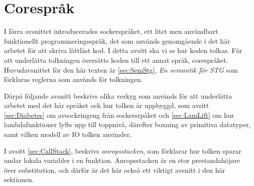 \documentclass[Rapport]{subfiles}
\begin{document}
\section{Corespråk}
\label{sec:Core}


\overviewCore


I förra avsnittet introducerades sockerspråket, ett litet men användbart
funktionellt programmeringsspråk, det som används genomgående i det här
arbetet för att skriva lättläst kod.
    I detta avsitt ska vi se hur koden tolkas. För att underlätta
tolkningen översätts koden till ett annat språk, corespråket. 
Huvudavsnittet för den här texten är \ref{sec:SemStg}, \emph{En semantik för STG}
som förklaras reglerna som används för
tolkningen. 

Därpå följande avsnitt beskrivs olika verkyg som används för att
underlätta arbetet med det här språket och hur tolken är uppbyggd,
som avsitt \ref{sec:Diabetes} om avsockringeng från sockersrpåket och \ref{sec:LamLift} 
om hur lambdafunktioner lyfts upp till toppnivå, därefter
boxning av primitiva datatyper, samt vilken modell av IO tolken använder.

I avsitt \ref{sec:CallStack}, beskrivs \emph{anropsstacken}, som förklarar hur tolken
sparar undar lokala variabler i en funktion. Anropsstacken är en 
stor prestandahöjare över substitution, och därför är det här också ett
viktigt avsnitt i den här sektionen.



%








\end{document}

